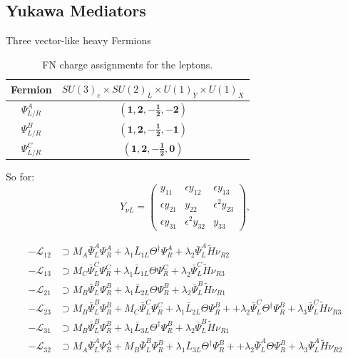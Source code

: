 \subsection{Yukawa Mediators}
Three vector-like heavy Fermions
\begin{table}[h]
\centering
\begin{tabular}{ | c | c | } 
  \hline
  Fermion & $SU(3)_c \times SU(2)_L  \times  U(1)_Y \times U(1)_X$  \\ 
  \hline
  \hline
  $\Psi^A_{L/R}$ & $(\mathbf{1},\mathbf{2},\mathbf{-\frac{1}{2}},\mathbf{-2})$ \\ 
  \hline
  $\Psi^B_{L/R}$ & $(\mathbf{1},\mathbf{2},\mathbf{-\frac{1}{2}},\mathbf{-1})$ \\ 
  \hline
  $\Psi^C_{L/R}$ & $(\mathbf{1},\mathbf{2},\mathbf{-\frac{1}{2}},\mathbf{0})$ \\ 
  \hline
\end{tabular}
\caption{FN charge assignments for the leptons.}
\label{Table 1}
\end{table}

So for: 
\begin{equation} \label{General Yukawa Neutrino}
    Y_{\nu L} = 
    \begin{pmatrix}
        y_{11} &\epsilon y_{12} & \epsilon y_{13} \\
        \epsilon y_{21}&y_{22}&\epsilon^{2}y_{23}\\
        \epsilon y_{31}& \epsilon^{2}y_{32}&y_{33}
    \end{pmatrix},
\end{equation}

\begin{align}
    -\mathcal{L}_{12} &\supset M_A\bar{\Psi}^A_{L}\Psi_{R}^A
    + \lambda_{1}\bar{L}_{1L}\Theta^\dagger \Psi_{R}^A
    + \lambda_{2}\bar{\Psi}_{L}^A \tilde{H} \nu_{R2} \\
    -\mathcal{L}_{13} &\supset M_C\bar{\Psi}^C_{L}\Psi_{R}^C + \lambda_{1}\bar{L}_{1L}  \Theta \Psi_{R}^C + \lambda_{2}\bar{\Psi}_{L}^C \tilde{H} \nu_{R3}\\
    -\mathcal{L}_{21} &\supset M_B\bar{\Psi}^B_{L}\Psi_{R}^B + \lambda_{1}\bar{L}_{2L}  \Theta \Psi_{R}^B + \lambda_{2}\bar{\Psi}_{L}^B \tilde{H} \nu_{R1} \\
    -\mathcal{L}_{23} &\supset M_B\bar{\Psi}^B_{L}\Psi_{R}^B + M_C\bar{\Psi}^C_{L}\Psi_{R}^C + \lambda_{1}\bar{L}_{2L}  \Theta \Psi_{R}^B + + \lambda_2 \bar{\Psi}_L^C \Theta^\dagger \Psi_R^B + \lambda_{3}\bar{\Psi}_{L}^C \tilde{H} \nu_{R3} \\
    -\mathcal{L}_{31} &\supset M_B\bar{\Psi}^B_{L}\Psi_{R}^B + \lambda_{1}\bar{L}_{3L}  \Theta^\dagger \Psi_{R}^B + \lambda_{2}\bar{\Psi}_{L}^B \tilde{H} \nu_{R1} \\
    -\mathcal{L}_{32} &\supset M_A\bar{\Psi}^A_{L}\Psi_{R}^A + M_B\bar{\Psi}^B_{L}\Psi_{R}^B + \lambda_{1}\bar{L}_{3L}  \Theta^\dagger \Psi_{R}^B + + \lambda_2 \bar{\Psi}_L^A \Theta \Psi_R^B+  \lambda_{3}\bar{\Psi}_{L}^A \tilde{H} \nu_{R2} 
\end{align}

